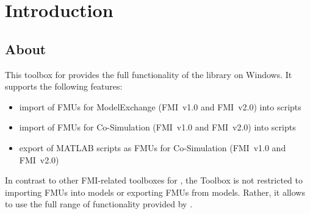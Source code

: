 \chapter{Introduction}


\section{About}

This toolbox for \matlab provides the full functionality of the \fmipp library on Windows.
It supports the following features:
\begin{itemize}
  \item import of FMUs for ModelExchange (FMI~v1.0 and FMI~v2.0) into \matlab scripts
  \item import of FMUs for Co-Simulation (FMI~v1.0 and FMI~v2.0) into \matlab scripts
  \item export of MATLAB scripts as FMUs for Co-Simulation (FMI~v1.0 and FMI~v2.0)
\end{itemize}
In contrast to other FMI-related toolboxes for \matlab, the \fmipp \matlab Toolbox is not restricted to importing FMUs into \simulink models or exporting FMUs from \simulink models.
Rather, it allows to use the full range of functionality provided by \matlab.
